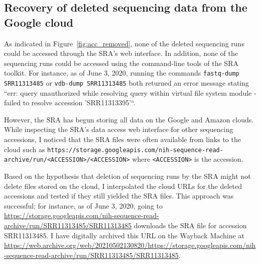 \documentclass[9pt,twocolumn,twoside]{gsajnl_modified}
\begin{document}
\subsection{Recovery of deleted sequencing data from the Google cloud} 
As indicated in Figure~\ref{fig:acc_removed}, none of the deleted sequencing runs could be accessed through the SRA's web interface.
In addition, none of the sequencing runs could be accessed using the command-line tools of the SRA toolkit.
For instance, as of June 3, 2020, running the commands \texttt{fastq-dump SRR11313485} or \texttt{vdb-dump SRR11313485} both returned an error message stating ``err: query unauthorized while resolving query within virtual file system module - failed to resolve accession 'SRR11313395'``.

However, the SRA has begun storing all data on the Google and Amazon clouds.
While inspecting the SRA's data access web interface for other sequencing accessions, I noticed that the SRA files were often available from links to the cloud such as \texttt{https://storage.googleapis.com/nih-sequence-read-archive/run/<ACCESSION>/<ACCESSION>} where \texttt{<ACCESSION>} is the accession.

Based on the hypothesis that deletion of sequencing runs by the SRA might not delete files stored on the cloud, I interpolated the cloud URLs for the deleted accessions and tested if they still yielded the SRA files.
This approach was successful; for instance, as of June 3, 2020, going to \url{https://storage.googleapis.com/nih-sequence-read-archive/run/SRR11313485/SRR11313485} downloads the SRA file for accession SRR11313485.
I have digitally archived this URL on the Wayback Machine at \url{https://web.archive.org/web/20210502130820/https://storage.googleapis.com/nih-sequence-read-archive/run/SRR11313485/SRR11313485}.


\end{document}
